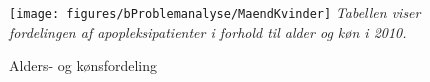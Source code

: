 \begin{figure}[H]
	\caption{Alders- og kønsfordeling}
	\label{AlderKoen}
	\centering
	\texttt{[image: figures/bProblemanalyse/MaendKvinder]}
	\flushleft
	\textit{Tabellen viser fordelingen af apopleksipatienter i forhold til alder og køn i 2010.}
\end{figure}





